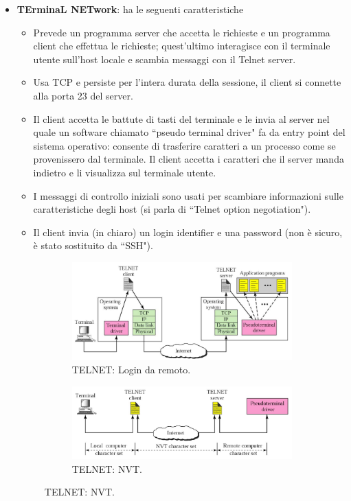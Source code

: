 \documentclass[11pt, italian, openany]{book}
\begin{document}
\begin{sloppypar}
\begin{itemize}[topsep=0pt]
	\item \textbf{TErminaL NETwork}: ha le seguenti caratteristiche
	\vspace{-3.5mm}
	\begin{itemize}
		\itemsep-0.3em
		\item Prevede un programma server che accetta le richieste e un programma client che effettua le richieste; quest'ultimo interagisce con il terminale
		utente sull'host locale e scambia messaggi con il Telnet server.
		\item Usa TCP e persiste per l'intera durata della sessione, il client si connette alla porta 23 del server.
		\item Il client accetta le battute di tasti del terminale e le invia al server nel quale un software chiamato ``pseudo terminal driver" fa da entry point
		del sistema operativo: consente di trasferire caratteri a un processo come se provenissero dal terminale.
		Il client accetta i caratteri che il server manda indietro e li visualizza sul terminale utente.
		\item  I messaggi di controllo iniziali sono usati per scambiare informazioni sulle caratteristiche degli host (si parla di ``Telnet option negotiation").
		\item Il client invia (in chiaro) un login identifier e una password (non \`e sicuro, \`e stato sostituito da ``SSH").
	\end{itemize}

	\begin{figure}[h!]
		\begin{subfigure}{0.49 \linewidth} \centering
			\includegraphics[scale=0.25]{images/telnet.png}
			\caption{TELNET: Login da remoto.}
		\end{subfigure}
		\begin{subfigure}{0.49 \linewidth} \centering
			\includegraphics[scale=0.25]{images/telnet-nvt.png}
			\caption{TELNET: NVT.}
		\end{subfigure}
	\end{figure}


\end{itemize}
\end{sloppypar}
\end{document}
